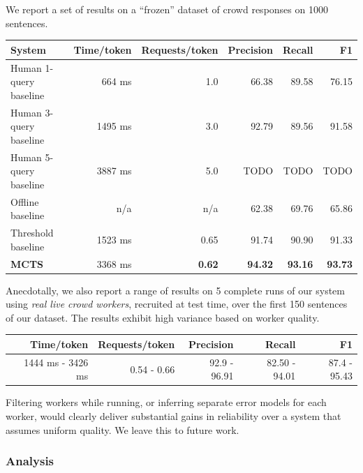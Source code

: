 We report a set of results on a ``frozen'' dataset of crowd responses on 1000 sentences.

\begin{center}
\begin{tabular}{ | l | r | r | r | r | r | }
    \hline
    \textbf{System} & \textbf{Time/token} & \textbf{Requests/token} & \textbf{Precision} & \textbf{Recall} & \textbf{F1} \\ \hline
    Human 1-query baseline & 664 ms & 1.0 & 66.38 & 89.58 & 76.15 \\ \hline
    Human 3-query baseline & 1495 ms & 3.0 & 92.79 & 89.56 & 91.58 \\ \hline
    Human 5-query baseline & 3887 ms & 5.0 & TODO & TODO & TODO \\ \hline
    Offline baseline & n/a & n/a & 62.38 & 69.76 & 65.86 \\ \hline
    Threshold baseline & 1523 ms & 0.65 & 91.74 & 90.90 & 91.33 \\ \hline
    \textbf{MCTS} & 3368 ms & \textbf{0.62} & \textbf{94.32} & \textbf{93.16} & \textbf{93.73} \\ \hline
\end{tabular}
\end{center}

Anecdotally, we also report a range of results on 5 complete runs of our system using {\em real live crowd workers}, recruited at test time, over the first 150 sentences of our dataset. The results exhibit high variance based on worker quality.

\begin{center}
\begin{tabular}{ | r | r | r | r | r | }
    \hline
    Time/token & Requests/token & Precision & Recall & F1 \\ \hline
    1444 ms - 3426 ms & 0.54 - 0.66 & 92.9 - 96.91 & 82.50 - 94.01 & 87.4 - 95.43 \\ \hline
\end{tabular}
\end{center}

Filtering workers while running, or inferring separate error models for each worker, would clearly deliver substantial gains in reliability over a system that assumes uniform quality. We leave this to future work.

\subsubsection{Analysis}

